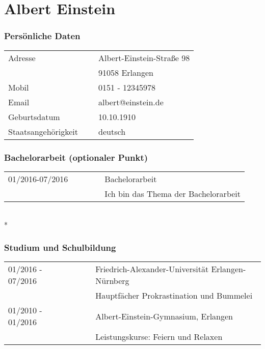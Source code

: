 

\chapter*{Albert Einstein}


\flushright
\subsection*{Persönliche Daten}
\flushleft
\normalsize
\begin{tabular}{lcl}
Adresse             & ~ & Albert-Einstein-Straße 98\\
                    & ~ & 91058 Erlangen\\[5pt]
Mobil               & ~ & 0151 - 12345978\\
Email               & ~ & albert@einstein.de\\[5pt]
Geburtsdatum        & ~ & 10.10.1910\\
Staatsangehörigkeit & ~ & deutsch\\
\end{tabular} 

\subsection*{Bachelorarbeit (optionaler Punkt)}
\begin{tabular}{lcl}
01/2016-07/2016     & ~~~~~ & Bachelorarbeit \\
                    & ~~~~~ & Ich bin das Thema der Bachelorarbeit\\[5pt]

\end{tabular} 
\\*  %

\nopagebreak
\subsection*{Studium und Schulbildung}
\begin{tabular}{lcl}
01/2016 - 07/2016     & ~~~ &  Friedrich-Alexander-Universität Erlangen-Nürnberg\\
                      & ~~~ &  Hauptfächer Prokrastination und Bummelei\\
01/2010 - 01/2016     & ~~~ &  Albert-Einstein-Gymnasium, Erlangen\\
                      & ~~~ &  Leistungskurse: Feiern und Relaxen\\
\end{tabular}

